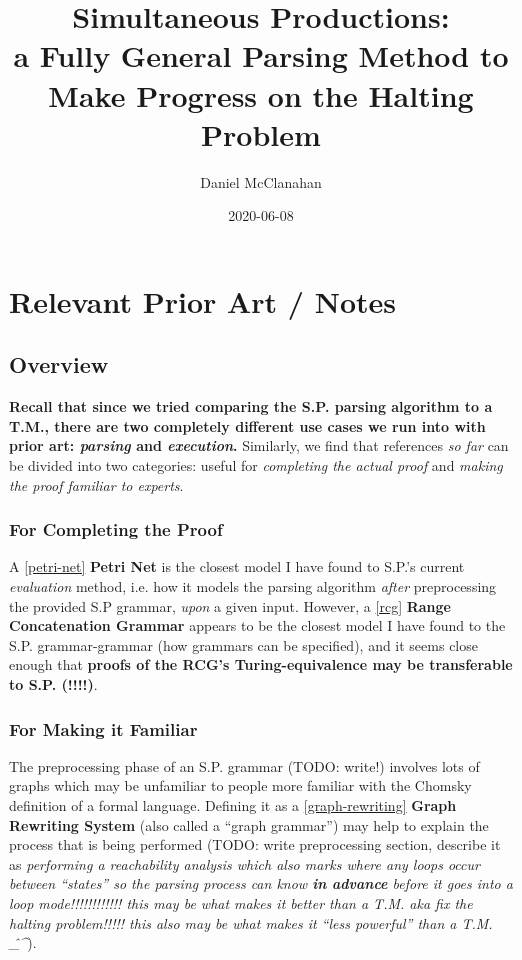 \documentclass{article}
\title{Simultaneous Productions: \\ a Fully General Parsing Method to Make Progress on the Halting Problem}
\date{2020-06-08}
\author{Daniel McClanahan}
\begin{document}
\maketitle

\section{Relevant Prior Art / Notes}
\subsection{Overview}

\textbf{Recall that since we tried comparing the S.P. parsing algorithm to a T.M., there are two completely different use cases we run into with prior art: \textit{parsing} and \textit{execution}.} Similarly, we find that references \textit{so far} can be divided into two categories: useful for \textit{completing the actual proof} and \textit{making the proof familiar to experts}.

\subsubsection{For Completing the Proof}
\label{completing-the-proof}

A \ref{petri-net} \textbf{Petri Net} is the closest model I have found to S.P.'s current \textit{evaluation} method, i.e. how it models the parsing algorithm \textit{after} preprocessing the provided S.P grammar, \textit{upon} a given input. However, a \ref{rcg} \textbf{Range Concatenation Grammar} appears to be the closest model I have found to the S.P. grammar-grammar (how grammars can be specified), and it seems close enough that \textbf{proofs of the RCG's Turing-equivalence may be transferable to S.P. (!!!!)}.

\subsubsection{For Making it Familiar}
\label{making-it-familiar}

The preprocessing phase of an S.P. grammar (TODO: write!) involves lots of graphs which may be unfamiliar to people more familiar with the Chomsky definition of a formal language. Defining it as a \ref{graph-rewriting} \textbf{Graph Rewriting System} (also called a ``graph grammar'') may help to explain the process that is being performed (TODO: write preprocessing section, describe it as \textit{performing a reachability analysis which also marks where any loops occur between ``states'' so the parsing process can know \textbf{in advance} before it goes into a loop mode!!!!!!!!!!!! this may be what makes it better than a T.M. aka fix the halting problem!!!!! this also may be what makes it ``less powerful'' than a T.M. \^\_\^}).
\end{document}
